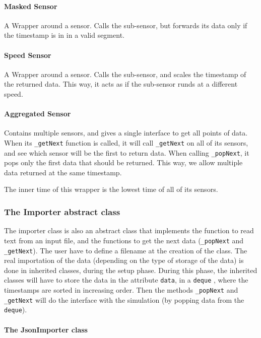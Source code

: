 \paragraph{Masked Sensor}

A Wrapper around a sensor. Calls the sub-sensor, but forwards its data only if
the timestamp is in in a valid segment.

\paragraph{Speed Sensor}

A Wrapper around a sensor. Calls the sub-sensor, and scales the timestamp of
the returned data. This way, it acts as if the sub-sensor runds at a different
speed.

\paragraph{Aggregated Sensor}

Contains multiple sensors, and gives a single interface to get all
points of data.  When its \verb!_getNext! function is called, it will call
\verb!_getNext! on all of its sensors, and see which sensor will be the first
to return data. When calling \verb!_popNext!, it pops only the first data
that should be returned. This way, we allow multiple data returned at the same
timestamp.

The inner time of this wrapper is the lowest time of all of its sensors.


\subsubsection{The Importer abstract class}

The importer class is also an abstract class that implements the function to read text from an input file, and the functions to get the next data (\verb!_popNext! and \verb!_getNext!). The user have to define a filename at the creation of the class. The real importation of the data (depending on the type of storage of the data) is done in inherited classes, during the setup phase. During this phase, the inherited classes will have to store the data in the attribute \verb!data!, in a \verb!deque! , where the timestamps are sorted in increasing order. Then the methods \verb!_popNext! and \verb!_getNext! will do the interface with the simulation (by popping data from the \verb!deque!).

\paragraph{The JsonImporter class}

